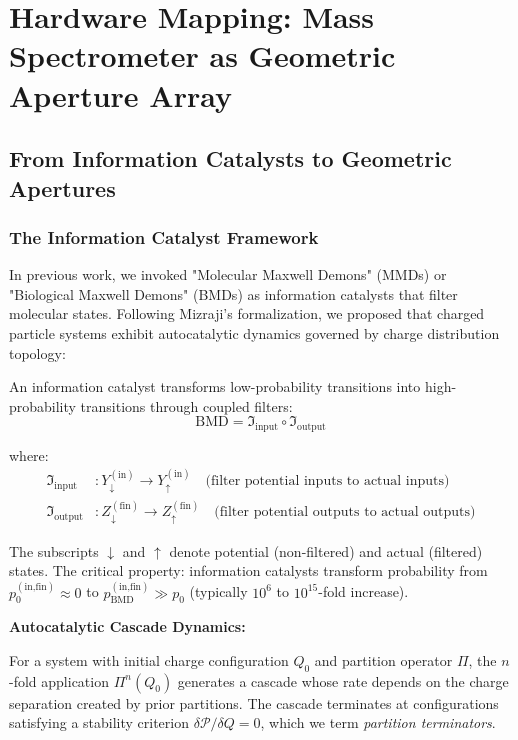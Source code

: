 \section{Hardware Mapping: Mass Spectrometer as Geometric Aperture Array}

\subsection{From Information Catalysts to Geometric Apertures}

\subsubsection{The Information Catalyst Framework}

In previous work, we invoked "Molecular Maxwell Demons" (MMDs) or "Biological Maxwell Demons" (BMDs) as information catalysts that filter molecular states. Following Mizraji's formalization, we proposed that charged particle systems exhibit autocatalytic dynamics governed by charge distribution topology:

\begin{definition}
\label{def:information_catalyst}
An information catalyst transforms low-probability transitions into high-probability transitions through coupled filters:
\begin{equation}
\text{BMD} = \mathfrak{I}_{\text{input}} \circ \mathfrak{I}_{\text{output}}
\end{equation}

where:
\begin{align}
\mathfrak{I}_{\text{input}}&: Y_{\downarrow}^{(\text{in})} \to Y_{\uparrow}^{(\text{in})} \quad \text{(filter potential inputs to actual inputs)} \\
\mathfrak{I}_{\text{output}}&: Z_{\downarrow}^{(\text{fin})} \to Z_{\uparrow}^{(\text{fin})} \quad \text{(filter potential outputs to actual outputs)}
\end{align}
\end{definition}

The subscripts $\downarrow$ and $\uparrow$ denote potential (non-filtered) and actual (filtered) states. The critical property: information catalysts transform probability from $p_0^{(\text{in,fin})} \approx 0$ to $p_{\text{BMD}}^{(\text{in,fin})} \gg p_0$ (typically $10^6$ to $10^{15}$-fold increase).

\textbf{Autocatalytic Cascade Dynamics:}

For a system with initial charge configuration $Q_0$ and partition operator $\Pi$, the $n$-fold application $\Pi^n(Q_0)$ generates a cascade whose rate depends on the charge separation created by prior partitions. The cascade terminates at configurations satisfying a stability criterion $\delta \mathcal{P} / \delta Q = 0$, which we term \textit{partition terminators}.

